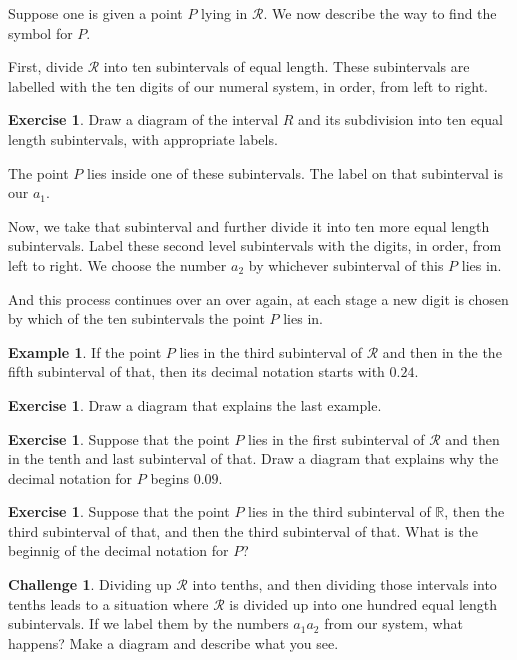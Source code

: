 \documentclass[12pt,letterpaper]{article}
\theoremstyle{definition}
\newtheorem{example}{Example}
\newtheorem{exercise}[question]{Exercise}
\newtheorem*{challenge}{Challenge}
\begin{document}
Suppose one is given a point $P$ lying in $\mathcal{R}$.
We now describe the way to find the symbol for $P$.

First, divide $\mathcal{R}$ into ten subintervals of equal length.
These subintervals are labelled with the ten digits of our numeral system, in order, from left to right.

\begin{exercise}
Draw a diagram of the interval $R$ and its subdivision into ten equal length subintervals, with appropriate labels.
\end{exercise}

The point $P$ lies inside one of these subintervals. 
The label on that subinterval is our $a_1$.

Now, we take that subinterval and further divide it into ten more equal length subintervals. 
Label these second level subintervals with the digits, in order, from left to right.
We choose the number $a_2$ by whichever subinterval of this $P$ lies in.

And this process continues over an over again, at each stage a new digit is chosen by which of the ten subintervals the point $P$ lies in.

\begin{example}
If the point $P$ lies in the third subinterval of $\mathcal{R}$ and then in the  the fifth subinterval of that, then its decimal notation starts with $0.24$.
\end{example}

\begin{exercise}
Draw a diagram that explains the last example.
\end{exercise}

\begin{exercise}
Suppose that the point $P$ lies in the first subinterval of $\mathcal{R}$ and then in the tenth and last subinterval of that.
Draw a diagram that explains why the decimal notation for $P$ begins $0.09$.
\end{exercise}

\begin{exercise}
Suppose that the point $P$ lies in the third subinterval of $\mathbb{R}$, then the third subinterval of that, and then the third subinterval of that.
What is the beginnig of the decimal notation for $P$?
\end{exercise}

\begin{challenge}
Dividing up $\mathcal{R}$ into tenths, and then dividing those intervals into tenths leads to a situation where $\mathcal{R}$ is divided up into one hundred equal length subintervals.
If we label them by the numbers $a_1a_2$ from our system, what happens?
Make a diagram and describe what you see.
\end{challenge}
\end{document}
